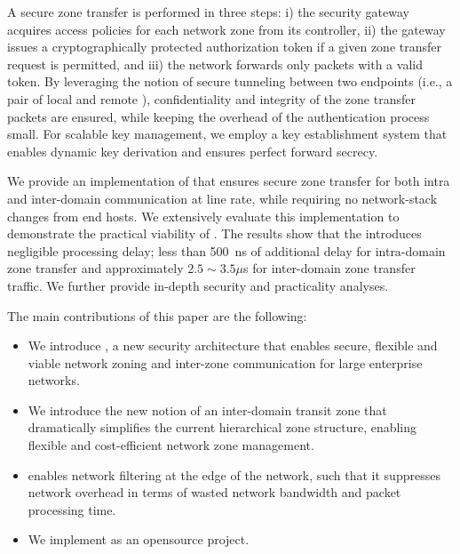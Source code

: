 A secure zone transfer is performed in three steps: i) the security gateway acquires
access policies for each network zone from its controller, ii) the gateway issues a
cryptographically protected authorization token if a given zone transfer request is
permitted, and iii) the network forwards only packets with a valid token. By leveraging
the notion of secure tunneling between two endpoints (i.e., a pair of local and remote \tps),
confidentiality and integrity of the zone transfer packets are ensured, while keeping the overhead of
the authentication process small. For scalable key management,
we employ a key establishment system that enables dynamic key derivation
and ensures perfect forward secrecy.

We provide an implementation of \name that ensures secure zone transfer for
both intra and inter-domain communication at line rate, while requiring no network-stack
changes from end hosts. We extensively evaluate this implementation to demonstrate
the practical viability of \name. The results show that the \tp introduces negligible
processing delay; less than \SI{500}{ns} of additional delay for intra-domain zone transfer
and approximately $2.5 \sim 3.5 \mu$s for inter-domain zone transfer traffic. We further
provide in-depth security and practicality analyses.

The main contributions of this paper are the following:
\begin{itemize}
	\item We introduce \name, a new security architecture that enables secure, flexible
	      and viable network zoning and inter-zone communication for large enterprise
	      networks.
	\item We introduce the new notion of an inter-domain transit zone that dramatically
	      simplifies the current hierarchical zone structure, enabling flexible and cost-efficient
	      network zone management.
	\item \name enables network filtering at the edge of the network, such that it suppresses
	      network overhead in terms of wasted network bandwidth and packet processing time.
	\item We implement \name as an opensource project.
\end{itemize}

